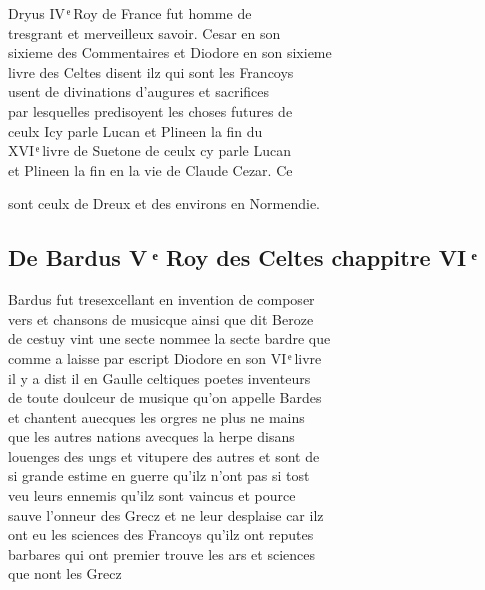 \documentclass[12pt]{article}
\begin{document}
Dryus IV ͤ Roy de France fut homme de\\
tresgrant et merveilleux savoir. Cesar en
            son\\
sixieme des Commentaires et
            Diodore en son sixieme\\
livre des Celtes
          disent ilz qui sont les Francoys\\
usent de divinations d'augures et sacrifices\\
par lesquelles predisoyent les choses futures de\\
ceulx Icy parle Lucan et
            Plineen la fin du\\
XVI ͤ livre de
            Suetone de ceulx cy parle
            Lucan\\
et Plineen la fin en la vie de Claude Cezar. Ce



\newpage
sont ceulx de Dreux et des environs en
          Normendie.





\subsection*{De Bardus V ͤ Roy des Celtes chappitre
          VI ͤ}


Bardus fut tresexcellant en invention de
            composer\\
vers et chansons de musicque ainsi que dit Beroze\\
de cestuy vint une secte nommee la secte bardre que\\
comme a laisse par escript Diodore
          en son VI ͤ livre\\
il y a
          dist il en Gaulle celtiques poetes inventeurs\\
de toute doulceur de musique qu'on
          appelle Bardes\\
et chantent auecques les orgres ne plus ne mains\\
que
          les autres nations avecques la herpe disans\\
louenges des ungs et vitupere des
          autres et sont de\\
si grande estime en guerre qu'ilz n'ont pas si tost\\
veu leurs ennemis qu'ilz sont vaincus et pource\\
sauve l'onneur des Grecz et
          ne leur desplaise car ilz\\
ont eu les sciences des Francoys qu'ilz ont
            reputes\\
barbares qui ont premier trouve les ars et sciences\\
que
          nont les Grecz
\end{document}
